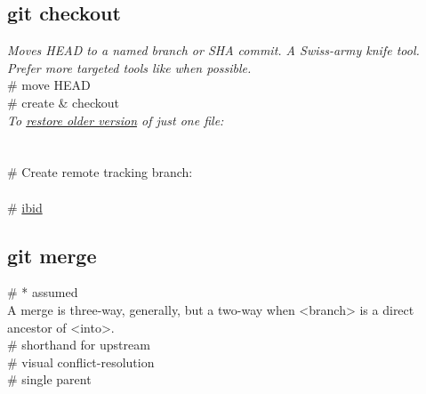 \subsection*{git checkout}
\textit{Moves HEAD to a named branch or SHA commit. A Swiss-army knife tool. Prefer more targeted tools like }\textit{ when possible.}\\%
 \# move HEAD \\
 \# create \& checkout \\[2mm]
\textit{To \href{https://stackoverflow.com/questions/215718/how-can-i-reset-or-revert-a-file-to-a-specific-revision}{restore older version} of just one file:}\\
\\
\\[2mm]
\# Create remote tracking branch:\\
 \\
 \# \href{https://stackoverflow.com/questions/3965676/why-did-my-git-repo-enter-a-detached-head-state}{ibid}\\



\subsection*{git merge}
 \# * assumed \\
A merge is three-way, generally, but a two-way  when <branch> is a direct ancestor of <into>.\\ 
 \# shorthand for upstream \\
 \# visual conflict-resolution \\
 \# single parent




